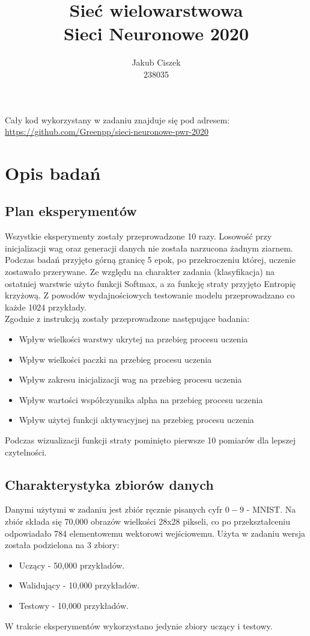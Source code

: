 \documentclass{article}
\title{  Sieć wielowarstwowa\\Sieci Neuronowe 2020 }
\author{
  Jakub Ciszek \\
  238035\\
}
\begin{document}
\maketitle

\newpage
\tableofcontents
\newpage

Cały kod wykorzystany w zadaniu znajduje się pod adresem: \url{https://github.com/Greenpp/sieci-neuronowe-pwr-2020}

\section{Opis badań}
\subsection{Plan eksperymentów}

Wszystkie eksperymenty zostały przeprowadzone 10 razy. Losowość przy inicjalizacji wag oraz generacji danych nie została narzucona żadnym ziarnem. Podczas badań przyjęto górną granicę 5 epok, po przekroczeniu której, uczenie zostawało przerywane. Ze względu na charakter zadania (klasyfikacja) na ostatniej warstwie użyto funkcji Softmax, a za funkcję straty przyjęto Entropię krzyżową.
Z powodów wydajnościowych testowanie modelu przeprowadzano co każde 1024 przykłady.\\
Zgodnie z instrukcją zostały przeprowadzone następujące badania:
\begin{itemize}
	\item Wpływ wielkości warstwy ukrytej na przebieg procesu uczenia
	\item Wpływ wielkości paczki na przebieg procesu uczenia
	\item Wpływ zakresu inicjalizacji wag na przebieg procesu uczenia
	\item Wpływ wartości współczynnika alpha na przebieg procesu uczenia
	\item Wpływ użytej funkcji aktywacyjnej na przebieg procesu uczenia     
\end{itemize}
Podczas wizualizacji funkcji straty pominięto pierwsze 10 pomiarów dla lepszej czytelności.

\subsection{Charakterystyka zbiorów danych}

Danymi użytymi w zadaniu jest zbiór ręcznie pisanych cyfr \(0-9\) - MNIST. Na zbiór składa się 70,000 obrazów wielkości 28x28 pikseli, co po przekształceniu odpowiadało 784 elementowemu wektorowi wejściowemu. Użyta w zadaniu wersja została podzielona na 3 zbiory:
\begin{itemize}
	\item Uczący - 50,000 przykładów.
	\item Walidujący - 10,000 przykładów.
	\item Testowy - 10,000 przykładów.
\end{itemize}
W trakcie eksperymentów wykorzystano jedynie zbiory uczący i testowy.
\end{document}
